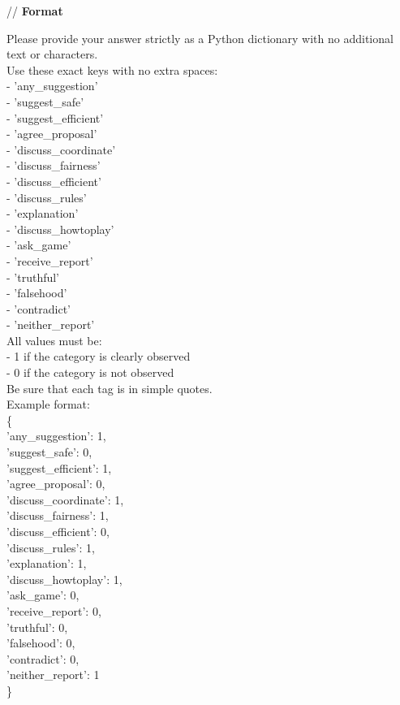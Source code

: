 \documentclass[11pt]{article}
\begin{document}
\begin{sloppypar}
\begin{appendices}
\begin{tcolorbox}
// \textbf{Format}

Please provide your answer strictly as a Python dictionary with no additional text or characters.\\

Use these exact keys with no extra spaces:\\
- 'any\_suggestion'\\
- 'suggest\_safe'\\
- 'suggest\_efficient'\\
- 'agree\_proposal'\\
- 'discuss\_coordinate'\\
- 'discuss\_fairness'\\
- 'discuss\_efficient'\\
- 'discuss\_rules'\\
- 'explanation'\\
- 'discuss\_howtoplay'\\
- 'ask\_game'\\
- 'receive\_report'\\
- 'truthful'\\
- 'falsehood'\\
- 'contradict'\\
- 'neither\_report'\\

All values must be:\\
- 1 if the category is clearly observed\\
- 0 if the category is not observed\\

Be sure that each tag is in simple quotes. \\
Example format:\\
\{\\
    'any\_suggestion': 1,\\
    'suggest\_safe': 0,\\
    'suggest\_efficient': 1,\\
    'agree\_proposal': 0,\\
    'discuss\_coordinate': 1,\\
    'discuss\_fairness': 1,\\
    'discuss\_efficient': 0,\\
    'discuss\_rules': 1,\\
    'explanation': 1,\\
    'discuss\_howtoplay': 1,\\
    'ask\_game': 0,\\
    'receive\_report': 0,\\
    'truthful': 0,\\
    'falsehood': 0,\\
    'contradict': 0,\\
    'neither\_report': 1\\
\}\\


\end{tcolorbox}
\end{appendices}
\end{sloppypar}
\end{document}
